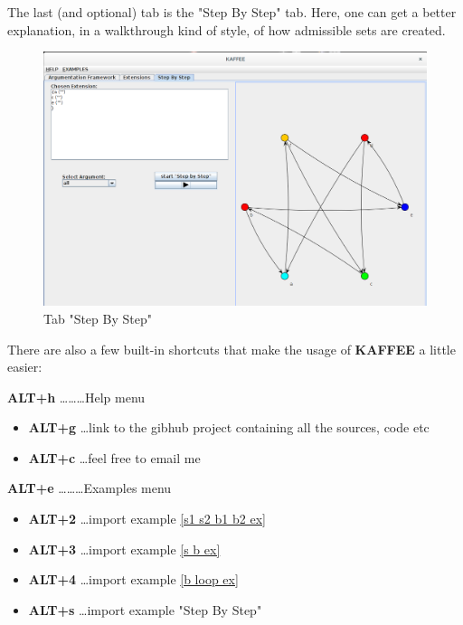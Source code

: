 \documentclass[12pt]{report}
\numberwithin{figure}{chapter}
\theoremstyle{break}
\begin{document}
\newpage

The last (and optional) tab is the "Step By Step" tab. Here, one can get a better explanation, in a walkthrough kind of style, of how admissible sets are created.

\bigskip
\begin{figure}[h!]
	\begin{center}\includegraphics[scale=0.35]{Images/Screenshot_KAFFEE_Tab3.png}
	\end{center}
\caption{Tab "Step By Step"}
\end{figure}

\bigskip
There are also a few built-in shortcuts that make the usage of \textbf{KAFFEE} a little easier:
\begin{description}
	\item{\textbf{ALT+h} \dots\dots\dots Help menu}
	\begin{itemize}
		\item{\textbf{ALT+g} \dots link to the gibhub project containing all the sources, code etc}
		\item{\textbf{ALT+c} \dots feel free to email me}
	\end{itemize}
	\item{\textbf{ALT+e} \dots\dots\dots Examples menu}
	\begin{itemize}
		\item{\textbf{ALT+2} \dots import example \ref{s1 s2 b1 b2 ex}}
		\item{\textbf{ALT+3} \dots import example \ref{s b ex}}
		\item{\textbf{ALT+4} \dots import example \ref{b loop ex}}
		\item{\textbf{ALT+s} \dots import example "Step By Step"}
	\end{itemize}
\end{description}

\printbibliography
\end{document}
